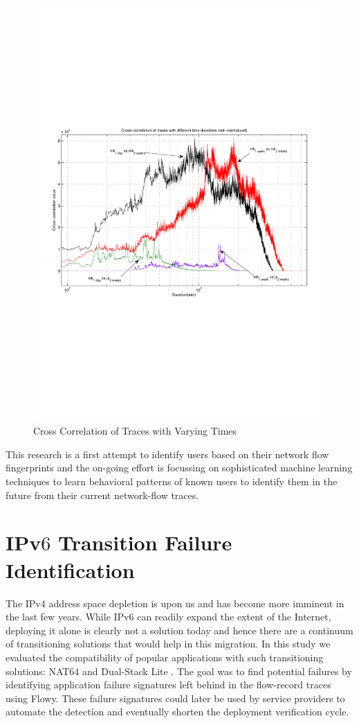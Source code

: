\begin{figure}[h!]
\begin{center}
  \includegraphics* [width=0.6\linewidth]{figures/cybermetrics-cross-correlate}
  \caption{Cross Correlation of Traces with Varying Times
					 \cite{nmelnikov:thesis:2010}}
  \label{fig:cybermetrics-cross-correlate}
\end{center}
\end{figure}

This research is a first attempt to identify users based on their network flow fingerprints and the on-going effort is focussing on sophisticated machine learning techniques to learn behavioral patterns of known users to identify them in the future from their current network-flow traces.

\section{IPv$6$ Transition Failure Identification}\label{sec:ipv6transeval}
The IPv$4$ address space depletion is upon us and has become more imminent in the last few years. While IPv$6$ can readily expand the extent of the Internet, deploying it alone is clearly not a solution today and hence there are a continuum of transitioning solutions that would help in this migration. In this study \cite{vbajpai:2012} we evaluated the compatibility of popular applications with such transitioning solutions: NAT$64$ \cite{rfc6146} and Dual-Stack Lite \cite{rfc6333}. The goal was to find potential failures by identifying application failure signatures left behind in the flow-record traces using Flowy. These failure signatures could later be used by service providers to automate the detection and eventually shorten the deployment verification cycle.

